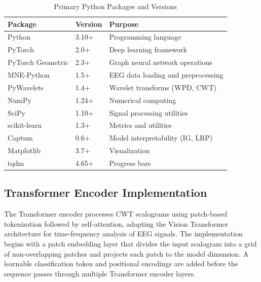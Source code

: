 \begin{table}[H]
    \centering
    \small
    \caption{Primary Python Packages and Versions}
    \label{tab:packages}
    \begin{tabularx}{\textwidth}{|L{3.5cm}|L{2cm}|X|}
        \hline
        \textbf{Package} & \textbf{Version} & \textbf{Purpose} \\
        \hline
        Python & 3.10+ & Programming language \\
        \hline
        PyTorch & 2.0+ & Deep learning framework \\
        \hline
        PyTorch Geometric & 2.3+ & Graph neural network operations \\
        \hline
        MNE-Python & 1.5+ & EEG data loading and preprocessing \\
        \hline
        PyWavelets & 1.4+ & Wavelet transforms (WPD, CWT) \\
        \hline
        NumPy & 1.24+ & Numerical computing \\
        \hline
        SciPy & 1.10+ & Signal processing utilities \\
        \hline
        scikit-learn & 1.3+ & Metrics and utilities \\
        \hline
        Captum & 0.6+ & Model interpretability (IG, LRP) \\
        \hline
        Matplotlib & 3.7+ & Visualization \\
        \hline
        tqdm & 4.65+ & Progress bars \\
        \hline
    \end{tabularx}
\end{table}

\subsection{Transformer Encoder Implementation}

The Transformer encoder processes CWT scalograms using patch-based tokenization followed by self-attention, adapting the Vision Transformer architecture for time-frequency analysis of EEG signals. The implementation begins with a patch embedding layer that divides the input scalogram into a grid of non-overlapping patches and projects each patch to the model dimension. A learnable classification token and positional encodings are added before the sequence passes through multiple Transformer encoder layers.

